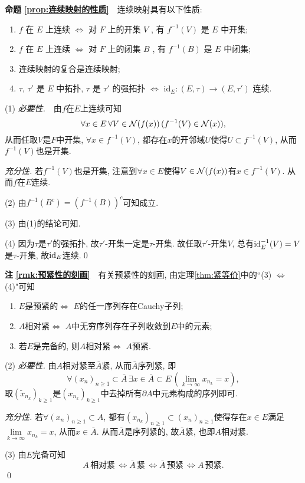     \textbf{命题\,\,\ref{prop:连续映射的性质}}\ \ 连续映射具有以下性质:
        \begin{enumerate}[(1)]
        \item $ f $ 在 $ E $ 上连续 $ \Longleftrightarrow $ 对 $ F $ 上的开集 $ V $ , 有 $ f^{-1}(V) $ 是 $ E $ 中开集;
        \item $ f $ 在 $ E $ 上连续 $ \Longleftrightarrow $ 对 $ F $ 上的闭集 $ B $ , 有 $ f^{-1}(B) $ 是 $ E $ 中闭集;
        \item 连续映射的复合是连续映射;
        \item $ \tau $, $ \tau' $ 是 $ E $ 中拓扑,  $ \tau $ 是 $ \tau' $ 的强拓扑 $ \Longleftrightarrow $ $ \mathrm{id}_{E}:(E, \tau)\to(E, \tau') $ 连续.
        \end{enumerate}
    \begin{Proof}
    (1) \textsl{必要性.}\ \ 由$ f $在$ E $上连续可知
    \[
    \forall x\in E\,\forall V\in\mathcal{N}(f(x))\,(f^{-1}(V)\in\mathcal{N}(x)),
    \]
    从而任取$ V $是$ F $中开集, $ \forall x\in f^{-1}(V) $, 都存在$ x $的开邻域$ U $使得$ U\subset f^{-1}(V) $, 从而$ f^{-1}(V) $也是开集.

    \textsl{充分性.} 若$ f^{-1}(V) $也是开集, 注意到$ \forall x\in E $使得$ V\in\mathcal{N}(f(x)) $有$ x\in f^{-1}(V) $. 从而$ f $在$ E $连续.

    (2) 由$ f^{-1}(B^c)=(f^{-1}(B))^c $可知成立.

    (3) 由(1)的结论可知.

    (4) 因为$ \tau $是$ \tau' $的强拓扑, 故$ \tau' $-开集一定是$ \tau $-开集. 故任取$ \tau' $-开集$ V $, 总有$ \mathrm{id}_E^{-1}(V)=V $是$ \tau $-开集, 故$ \mathrm{id}_E $连续.\qed
    \end{Proof}

    \textbf{注\,\,\ref{rmk:预紧性的刻画}}\ \ 有关预紧性的刻画, 由定理\ref{thm:紧等价}中的``(3) $ \Leftrightarrow $ (4)"可知
    \begin{enumerate}[(1)]
    \item $ E $是预紧的$ \Longleftrightarrow $ $ E $的任一序列存在Cauchy子列;
    \item $ A $相对紧$ \Longleftrightarrow $ $ A $中无穷序列存在子列收敛到$ E $中的元素;
    \item 若$ E $是完备的, 则$ A $相对紧$ \Longleftrightarrow $ $ A $预紧.
    \end{enumerate}
    \begin{Proof}
    (2) \textsl{必要性.} 由$ A $相对紧至$ \bar{A} $紧, 从而$ \bar{A} $序列紧, 即
    \[
    \forall (x_n)_{n\geqslant 1}\subset\bar{A}\,\exists x\in\bar{A}\subset E\,(\lim_{k\to\infty}x_{n_k}=x),
    \]
    取$ (\tilde{x}_{n_k})_{k\geqslant 1} $是$ (x_{n_k})_{k\geqslant 1} $中去掉所有$ \partial A $中元素构成的序列即可.

    \textsl{充分性.} 若$ \forall (x_n)_{n\geqslant 1}\subset A $, 都有$ (x_{n_k})_{n\geqslant 1}\subset(x_n)_{n\geqslant 1} $使得存在$ x\in E $满足$ \lim\limits_{k\to\infty}x_{n_k}=x $, 从而$ x\in\bar{A} $. 从而$ \bar{A} $是序列紧的, 故$ \bar{A} $紧, 也即$ A $相对紧.

    (3) 由$ E $完备可知
    \[
    A\,\text{相对紧}\,\Longleftrightarrow\bar{A}\,\text{紧}\,\Longleftrightarrow\bar{A}\,\text{预紧}\,\Longleftrightarrow A\,\text{预紧}.
    \]
    \qed
    \end{Proof}

